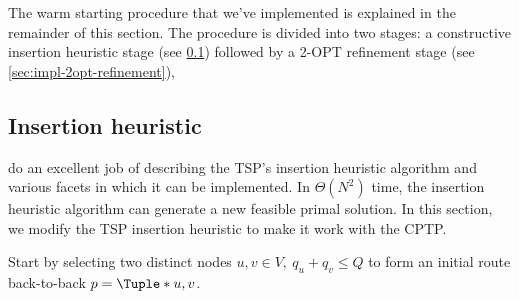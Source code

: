 \medskip

The warm starting procedure that we've implemented is explained in the remainder of this section.
The procedure is divided into two stages:
a constructive insertion heuristic stage (see \cref{sec:impl-insertion-heuristic})
followed by a 2-OPT refinement stage (see \cref{sec:impl-2opt-refinement}),

\subsection{Insertion heuristic}
\label{sec:impl-insertion-heuristic}

\cite{rosenkrantz1977} do an excellent job of describing the TSP's insertion heuristic algorithm
and various facets in which it can be implemented.
In $\Theta(N^2)$ time, the insertion heuristic algorithm can generate a new feasible primal solution.
In this section,
we modify the TSP insertion heuristic
to make it work with the CPTP.

\medskip

Start by selecting two distinct nodes $u, v \in V,\ q_u + q_v \le Q$
to form an initial route back-to-back $p = \Tuple*{u, v}$.


